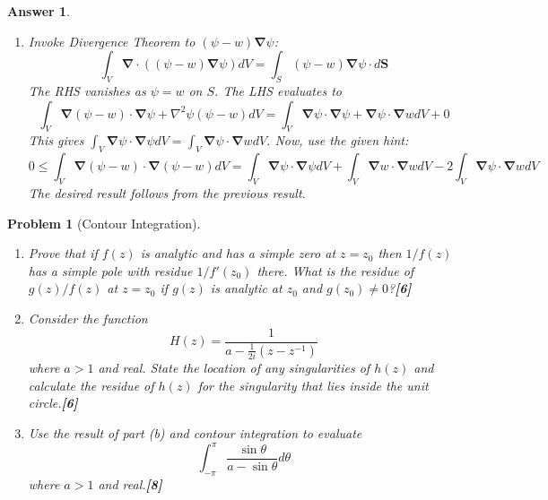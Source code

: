 \documentclass[a4paper]{article}
\newtheorem{ans}{Answer}[section]
\theoremstyle{new}
\newtheorem{qns}{Problem}[section]
\begin{document}
\begin{ans}
\begin{enumerate}[label=(\alph*)]
\begin{enumerate}[label=(\roman*)]
Since the Klein's Gordon equation is linear, the solution will be a linear combination of the fundamental solutions:
$$G=\frac{1}{4\pi}\bigg(\frac{e^{-k|\mathbf{r}-\mathbf{r_0}|}}{|\mathbf{r}-\mathbf{r_0}|}-\frac{e^{-k|\mathbf{r}-\mathbf{r'}|}}{|\mathbf{r}-\mathbf{r'}|}\bigg)$$
\end{enumerate}
\item Invoke Divergence Theorem to $(\psi-w)\boldsymbol{\nabla}\psi$:
$$\int_V\boldsymbol{\nabla}\cdot((\psi-w)\boldsymbol{\nabla}\psi)dV=\int_S(\psi-w)\boldsymbol{\nabla}\psi\cdot d\mathbf{S}$$
The RHS vanishes as $\psi=w$ on $S$. The LHS evaluates to
$$\int_V\boldsymbol{\nabla}(\psi-w)\cdot\boldsymbol{\nabla}\psi+\nabla^2\psi(\psi-w)dV=\int_V\boldsymbol{\nabla}\psi\cdot\boldsymbol{\nabla}\psi+\boldsymbol{\nabla}\psi\cdot\boldsymbol{\nabla}wdV+0$$
This gives $\int_V\boldsymbol{\nabla}\psi\cdot\boldsymbol{\nabla}\psi dV=\int_V\boldsymbol{\nabla}\psi\cdot\boldsymbol{\nabla}w dV$. Now, use the given hint:
$$0\leq\int_V\boldsymbol{\nabla}(\psi-w)\cdot\boldsymbol{\nabla}(\psi-w)dV=\int_V\boldsymbol{\nabla}\psi\cdot\boldsymbol{\nabla}\psi dV+\int_V\boldsymbol{\nabla}w\cdot\boldsymbol{\nabla}wdV-2\int_V\boldsymbol{\nabla}\psi\cdot\boldsymbol{\nabla}wdV$$
The desired result follows from the previous result. 
\end{enumerate}
\end{ans}
\newpage
\begin{qns}[Contour Integration]\leavevmode
\begin{enumerate}[label=(\alph*)]
\item Prove that if $f(z)$ is analytic and has a simple zero at $z = z_0$ then $1/f(z)$ has a simple pole with residue $1/f'(z_0)$ there. What is the residue of $g(z)/f(z)$ at $z = z_0$ if $g(z)$ is analytic at $z_0$ and $g(z_0)\neq 0$?\hfill\textbf{[6]}
\item Consider the function
$$H(z)=\frac{1}{a-\frac{1}{2i}(z-z^{-1})}$$
where $a>1$ and real. State the location of any singularities of $h(z)$ and calculate the residue of $h(z)$ for the singularity that lies inside the unit circle.\hfill\textbf{[6]}
\item Use the result of part (b) and contour integration to evaluate
$$\int_{-\pi}^\pi\frac{\sin\theta}{a-\sin\theta}d\theta$$
where $a>1$ and real.\hfill\textbf{[8]}
\end{enumerate}
\end{qns}
\end{document}
